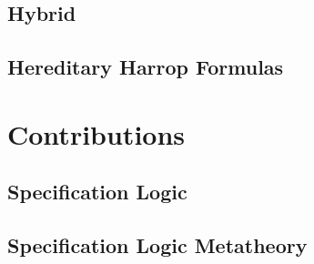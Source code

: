 \documentclass[12pt]{UOthesis}
\theoremstyle{remarkstyle}
\begin{document}


\cleardoublepage


\chapter{Hybrid}
\label{ch:hybrid}



\cleardoublepage



\chapter{Hereditary Harrop Formulas}
\label{ch:hh}



\cleardoublepage



\part{Contributions}


\allowdisplaybreaks[0]


\chapter{Specification Logic}
\label{ch:sl}





\cleardoublepage


\chapter{Specification Logic Metatheory}
\label{ch:slind}

\end{document}
